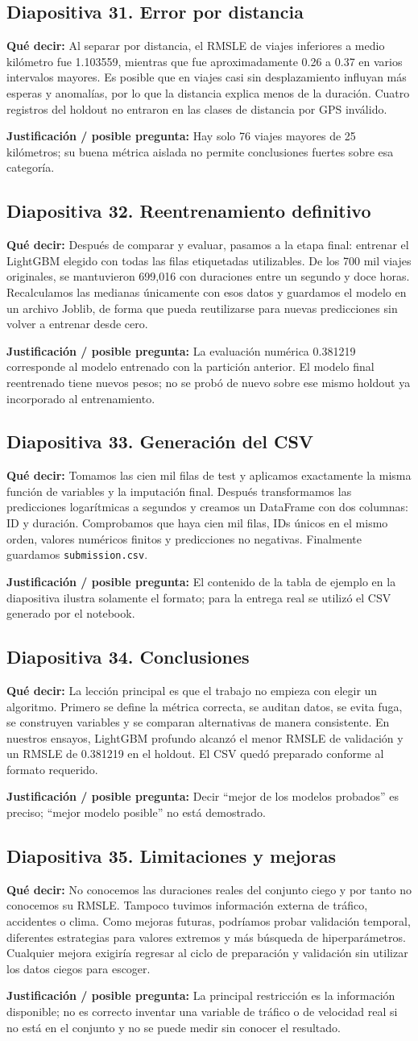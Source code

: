 \documentclass[11pt,letterpaper]{article}
\newcommand{\lamina}[2]{\subsection*{Diapositiva #1. #2}}
\newcommand{\explica}[1]{\noindent\textcolor{azul}{\textbf{Qué decir:}} #1\par\smallskip}
\newcommand{\defiende}[1]{\noindent\textcolor{verde}{\textbf{Justificación / posible pregunta:}} #1\par\medskip}
\begin{document}
\lamina{31}{Error por distancia}
\explica{Al separar por distancia, el RMSLE de viajes inferiores a medio kilómetro fue 1.103559, mientras que fue aproximadamente 0.26 a 0.37 en varios intervalos mayores. Es posible que en viajes casi sin desplazamiento influyan más esperas y anomalías, por lo que la distancia explica menos de la duración. Cuatro registros del holdout no entraron en las clases de distancia por GPS inválido.}
\defiende{Hay solo 76 viajes mayores de 25 kilómetros; su buena métrica aislada no permite conclusiones fuertes sobre esa categoría.}

\lamina{32}{Reentrenamiento definitivo}
\explica{Después de comparar y evaluar, pasamos a la etapa final: entrenar el LightGBM elegido con todas las filas etiquetadas utilizables. De los 700 mil viajes originales, se mantuvieron 699,016 con duraciones entre un segundo y doce horas. Recalculamos las medianas únicamente con esos datos y guardamos el modelo en un archivo Joblib, de forma que pueda reutilizarse para nuevas predicciones sin volver a entrenar desde cero.}
\defiende{La evaluación numérica 0.381219 corresponde al modelo entrenado con la partición anterior. El modelo final reentrenado tiene nuevos pesos; no se probó de nuevo sobre ese mismo holdout ya incorporado al entrenamiento.}

\lamina{33}{Generación del CSV}
\explica{Tomamos las cien mil filas de test y aplicamos exactamente la misma función de variables y la imputación final. Después transformamos las predicciones logarítmicas a segundos y creamos un DataFrame con dos columnas: ID y duración. Comprobamos que haya cien mil filas, IDs únicos en el mismo orden, valores numéricos finitos y predicciones no negativas. Finalmente guardamos \texttt{submission.csv}.}
\defiende{El contenido de la tabla de ejemplo en la diapositiva ilustra solamente el formato; para la entrega real se utilizó el CSV generado por el notebook.}

\lamina{34}{Conclusiones}
\explica{La lección principal es que el trabajo no empieza con elegir un algoritmo. Primero se define la métrica correcta, se auditan datos, se evita fuga, se construyen variables y se comparan alternativas de manera consistente. En nuestros ensayos, LightGBM profundo alcanzó el menor RMSLE de validación y un RMSLE de 0.381219 en el holdout. El CSV quedó preparado conforme al formato requerido.}
\defiende{Decir ``mejor de los modelos probados'' es preciso; ``mejor modelo posible'' no está demostrado.}

\lamina{35}{Limitaciones y mejoras}
\explica{No conocemos las duraciones reales del conjunto ciego y por tanto no conocemos su RMSLE. Tampoco tuvimos información externa de tráfico, accidentes o clima. Como mejoras futuras, podríamos probar validación temporal, diferentes estrategias para valores extremos y más búsqueda de hiperparámetros. Cualquier mejora exigiría regresar al ciclo de preparación y validación sin utilizar los datos ciegos para escoger.}
\defiende{La principal restricción es la información disponible; no es correcto inventar una variable de tráfico o de velocidad real si no está en el conjunto y no se puede medir sin conocer el resultado.}
\end{document}
